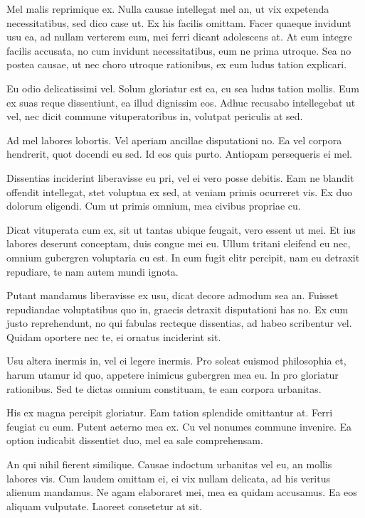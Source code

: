 \documentclass{adhsernotes}
\begin{document}
Mel malis reprimique ex. Nulla causae intellegat mel an, ut vix expetenda
necessitatibus, sed dico case ut. Ex his facilis omittam. Facer quaeque invidunt
usu ea, ad nullam verterem eum, mei ferri dicant adolescens at. At eum integre
facilis accusata, no cum invidunt necessitatibus, eum ne prima utroque. Sea no
postea causae, ut nec choro utroque rationibus, ex eum ludus tation explicari.

Eu odio delicatissimi vel. Solum gloriatur est ea, cu sea ludus tation
mollis. Eum ex suas reque dissentiunt, ea illud dignissim eos. Adhuc recusabo
intellegebat ut vel, nec dicit commune vituperatoribus in, volutpat periculis at
sed.

Ad mel labores lobortis. Vel aperiam ancillae disputationi no. Ea vel corpora
hendrerit, quot docendi eu sed. Id eos quis purto. Antiopam persequeris ei mel.

Dissentias inciderint liberavisse eu pri, vel ei vero posse debitis. Eam ne
blandit offendit intellegat, stet voluptua ex sed, at veniam primis ocurreret
vis. Ex duo dolorum eligendi. Cum ut primis omnium, mea civibus propriae cu.

Dicat vituperata cum ex, sit ut tantas ubique feugait, vero essent ut mei. Et
ius labores deserunt conceptam, duis congue mei eu. Ullum tritani eleifend eu
nec, omnium gubergren voluptaria cu est. In eum fugit elitr percipit, nam eu
detraxit repudiare, te nam autem mundi ignota.

Putant mandamus liberavisse ex usu, dicat decore admodum sea an. Fuisset
repudiandae voluptatibus quo in, graecis detraxit disputationi has no. Ex cum
justo reprehendunt, no qui fabulas recteque dissentias, ad habeo scribentur
vel. Quidam oportere nec te, ei ornatus inciderint sit.

Usu altera inermis in, vel ei legere inermis. Pro soleat euismod philosophia et,
harum utamur id quo, appetere inimicus gubergren mea eu. In pro gloriatur
rationibus. Sed te dictas omnium constituam, te eam corpora urbanitas.

His ex magna percipit gloriatur. Eam tation splendide omittantur at. Ferri
feugiat cu eum. Putent aeterno mea ex. Cu vel nonumes commune invenire. Ea
option iudicabit dissentiet duo, mel ea sale comprehensam.

An qui nihil fierent similique. Causae indoctum urbanitas vel eu, an mollis
labores vis. Cum laudem omittam ei, ei vix nullam delicata, ad his veritus
alienum mandamus. Ne agam elaboraret mei, mea ea quidam accusamus. Ea eos
aliquam vulputate. Laoreet consetetur at sit.
\end{document}
